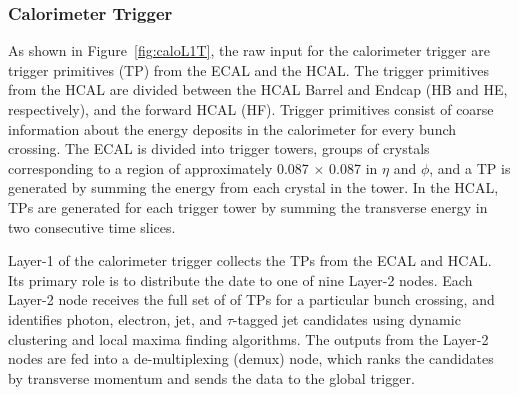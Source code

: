\subsubsection{Calorimeter Trigger}
As shown in Figure~\ref{fig:caloL1T}, the raw input for the calorimeter trigger are trigger primitives (TP) from the ECAL and the HCAL. The trigger primitives from the HCAL are divided between the HCAL Barrel and Endcap (HB and HE, respectively), and the forward HCAL (HF). Trigger primitives consist of coarse information about the energy deposits  in the calorimeter for every bunch crossing. The ECAL is divided into trigger towers, groups of crystals corresponding to a region of approximately 0.087 $\times$ 0.087 in $\eta$ and $\phi$, and a TP is generated by summing the energy from each crystal in the tower. In the HCAL, TPs are generated for each trigger tower by summing the transverse energy in two consecutive time slices. 

Layer-1 of the calorimeter trigger collects the TPs from the ECAL and HCAL. Its primary role is to distribute the date to one of nine Layer-2 nodes. Each Layer-2 node receives the full set of of TPs for a particular bunch crossing, and identifies photon, electron, jet, and $\tau$-tagged jet candidates using dynamic clustering and local maxima finding algorithms. The outputs from the Layer-2 nodes are fed into a de-multiplexing (demux) node, which ranks the candidates by transverse momentum and sends the data to the global trigger. 


